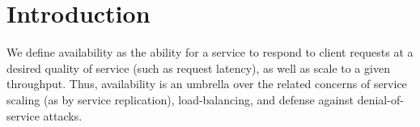 \section{Introduction}
\label{sec:intro}
%

We define availability as the ability for a service to respond to
client requests at a desired quality of service (such as request latency),
as well as scale to a given throughput.
%
Thus, availability is an umbrella over the related concerns of
service scaling (as by service replication), load-balancing, and defense
against denial-of-service attacks.
%

